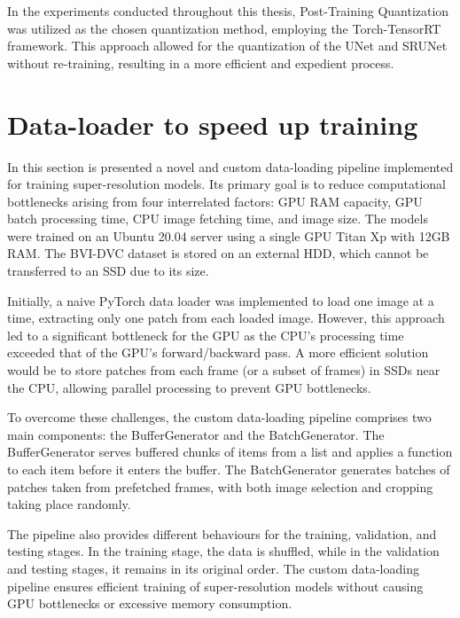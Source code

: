 In the experiments conducted throughout this thesis, Post-Training Quantization was utilized as the chosen quantization method, employing the Torch-TensorRT framework. This approach allowed for the quantization of the UNet and SRUNet without re-training, resulting in a more efficient and expedient process.

\section{Data-loader to speed up training}
\label{sec:dataloader}

In this section is presented a novel and custom data-loading pipeline implemented for training super-resolution models. Its primary goal is to reduce computational bottlenecks arising from four interrelated factors: GPU RAM capacity, GPU batch processing time, CPU image fetching time, and image size. The models were trained on an Ubuntu 20.04 server using a single GPU Titan Xp with 12GB RAM. The BVI-DVC dataset is stored on an external HDD, which cannot be transferred to an SSD due to its size.

Initially, a naive PyTorch data loader was implemented to load one image at a time, extracting only one patch from each loaded image. However, this approach led to a significant bottleneck for the GPU as the CPU's processing time exceeded that of the GPU's forward/backward pass. A more efficient solution would be to store patches from each frame (or a subset of frames) in SSDs near the CPU, allowing parallel processing to prevent GPU bottlenecks.

To overcome these challenges, the custom data-loading pipeline comprises two main components: the BufferGenerator and the BatchGenerator. The BufferGenerator serves buffered chunks of items from a list and applies a function to each item before it enters the buffer. The BatchGenerator generates batches of patches taken from prefetched frames, with both image selection and cropping taking place randomly.

The pipeline also provides different behaviours for the training, validation, and testing stages. In the training stage, the data is shuffled, while in the validation and testing stages, it remains in its original order. The custom data-loading pipeline ensures efficient training of super-resolution models without causing GPU bottlenecks or excessive memory consumption.

